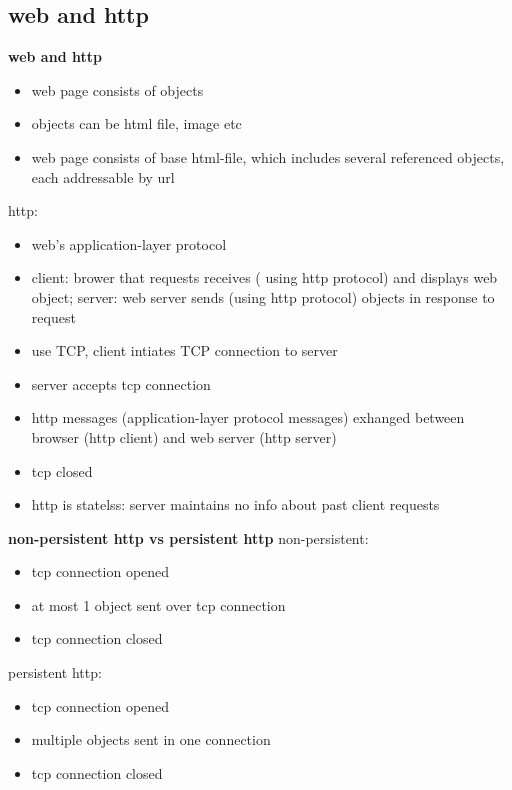 \documentclass[10pt]{article}
\theoremstyle{break}
\begin{document}
\subsection{web and http}
\textbf{web and http}
\begin{itemize}
    \item web page consists of objects
    \item objects can be html file, image etc 
    \item web page consists of base html-file, which includes several referenced objects, each addressable by url 
\end{itemize}

http:
\begin{itemize}
    \item web's application-layer protocol 
    \item client: brower that requests receives ( using http protocol) and displays web object; server: web server sends (using http protocol) objects in response to request
    \item use TCP, client intiates TCP connection to server 
    \item server accepts tcp connection 
    \item http messages (application-layer protocol messages) exhanged between browser (http client) and web server (http server)
    \item tcp closed
    \item http is statelss: server maintains no info about past client requests
\end{itemize}

\textbf{non-persistent http vs persistent http}
non-persistent:
\begin{itemize}
    \item tcp connection opened 
    \item at most 1 object sent over tcp connection 
    \item tcp connection closed 
\end{itemize}

persistent http:
\begin{itemize}
    \item tcp connection opened 
    \item multiple objects sent in one connection 
    \item tcp connection closed
\end{itemize}
\end{document}
